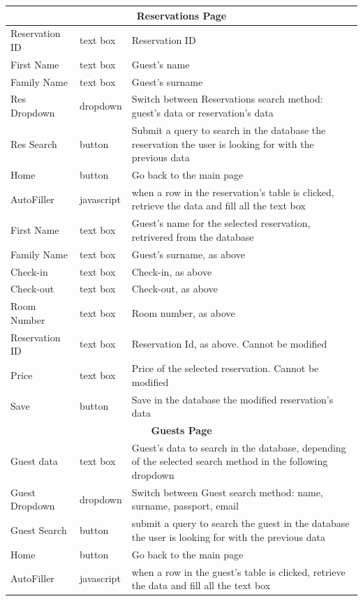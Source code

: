 \begin{center}
\begin{longtable}{| l | l | p{7cm} |}
	\hline \hline
	\multicolumn{3}{|c|}{\textbf{Reservations Page}} \\ 
	\hline \hline
	Reservation ID	& text box 		& Reservation ID \\ 
	First Name 		& text box	 	& Guest's name \\ 
	Family Name	 	& text box 		& Guest's surname \\ 
	Res Dropdown 	& dropdown 		& Switch between Reservations search method: guest's data or reservation's data \\ 
	Res Search		& button		& Submit a query to search in the database the reservation the user is looking for with the previous data \\
	Home			& button		& Go back to the main page \\
	\hline
	AutoFiller		& javascript	& when a row in the reservation's table is clicked, retrieve the data and fill all the text box \\
	First Name		& text box		& Guest's name for the selected reservation, retrivered from the database \\
	Family Name		& text box		& Guest's surname, as above \\
	Check-in		& text box		& Check-in, as above \\
	Check-out		& text box		& Check-out, as above \\
	Room Number		& text box		& Room number, as above \\
	Reservation ID	& text box		& Reservation Id, as above. Cannot be modified \\
	Price			& text box		& Price of the selected reservation. Cannot be modified \\
	Save			& button		& Save in the database the modified reservation's data \\
	\hline \hline
	\multicolumn{3}{|c|}{\textbf{Guests Page}} \\ 
	\hline \hline
	Guest data		& text box		& Guest's data to search in the database, depending of the selected search method in the following dropdown \\ 
	Guest Dropdown	& dropdown 		& Switch between Guest search method: name, surname, passport, email \\ 
	Guest Search	& button		& submit a query to search the guest in the database the user is looking for with the previous data \\
	Home			& button		& Go back to the main page \\
	\hline
	AutoFiller		& javascript	& when a row in the guest's table is clicked, retrieve the data and fill all the text box \\

\end{longtable}
\end{center}
